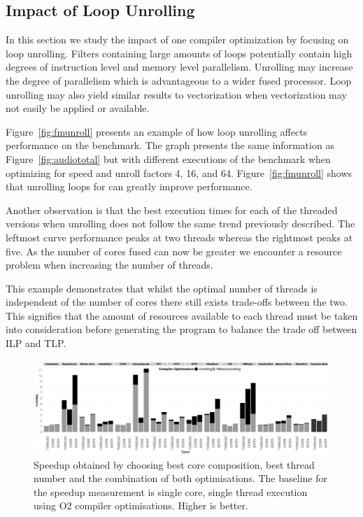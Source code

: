\subsection{Impact of Loop Unrolling}
In this section we study the impact of one compiler optimization by focusing on loop unrolling.
Filters containing large amounts of loops potentially contain high degrees of instruction level and memory level parallelism.
Unrolling may increase the degree of parallelism which is advantageous to a wider fused processor.
Loop unrolling may also yield similar results to vectorization when vectorization may not easily be applied or available.

Figure~\ref{fig:fmunroll} presents an example of how loop unrolling affects performance on the  benchmark.
The graph presents the same information as Figure~\ref{fig:audiototal} but with different executions of the benchmark when optimizing for speed and unroll factors 4, 16, and 64.
Figure~\ref{fig:fmunroll} shows that unrolling loops for  can greatly improve performance.

Another observation is that the best execution times for each of the threaded versions when unrolling does not follow the same trend previously described.
The leftmost curve performance peaks at two threads whereas the rightmost peaks at five.
As the number of cores fused can now be greater we encounter a resource problem when increasing the number of threads.

This example demonstrates that whilst the optimal number of threads is independent of the number of cores there still exists trade-offs between the two.
This signifies that the amount of resources available to each thread must be taken into consideration before generating the program to balance the trade off between ILP and TLP.

\begin{figure}[t]
 \centering
  \centering
    \includegraphics[width=1\textwidth]{graphics/threadcompbench.pdf}
    \caption{Speedup obtained by choosing best core composition, best
      thread number and the combination of both optimisations. The baseline for the speedup measurement is single core, single thread execution using O2 compiler optimisations. Higher
      is better.}\label{fig:overviewhist}
\vspace{-1mm}
\end{figure}

